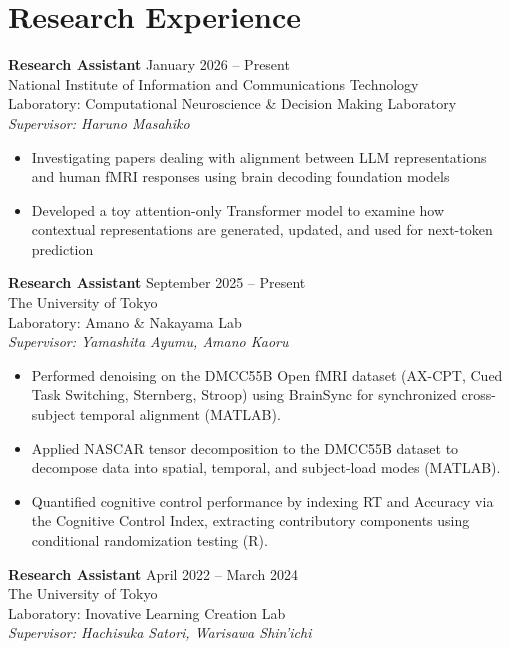 \documentclass[letterpaper,10.5pt]{article}
\begin{document}
\section*{Research Experience}
\textbf{Research Assistant} \hfill January 2026 -- Present \\ 
National Institute of Information and Communications Technology \\ 
{\small {Laboratory: Computational Neuroscience \& Decision Making Laboratory}} \\ 
{\small \textit{Supervisor: Haruno Masahiko}} \\ 
\begin{itemize}
  \item Investigating papers dealing with alignment between LLM representations and human fMRI responses using brain decoding foundation models
  \item Developed a toy attention-only Transformer model to examine how contextual representations are generated, updated, and used for next-token prediction
\end{itemize}
\vspace{8pt}
\textbf{Research Assistant} \hfill September 2025 -- Present \\ 
The University of Tokyo \\ 
{\small {Laboratory: Amano \& Nakayama Lab}} \\ 
{\small \textit{Supervisor: Yamashita Ayumu, Amano Kaoru}} \\ 
\begin{itemize}
  \item Performed denoising on the DMCC55B Open fMRI dataset (AX-CPT, Cued Task Switching, Sternberg, Stroop) using BrainSync for synchronized cross-subject temporal alignment (MATLAB).
  \item Applied NASCAR tensor decomposition to the DMCC55B dataset to decompose data into spatial, temporal, and subject-load modes (MATLAB).
  \item Quantified cognitive control performance by indexing RT and Accuracy via the Cognitive Control Index, extracting contributory components using conditional randomization testing (R).
\end{itemize}
\vspace{8pt}
\textbf{Research Assistant} \hfill April 2022 -- March 2024 \\ 
The University of Tokyo \\ 
{\small {Laboratory: Inovative Learning Creation Lab}} \\ 
{\small \textit{Supervisor: Hachisuka Satori, Warisawa Shin'ichi}} \\ 
\end{document}
